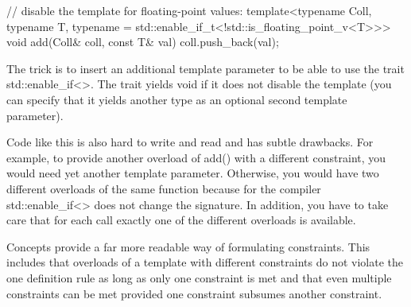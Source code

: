 \begin{cpp}
// disable the template for floating-point values:
template<typename Coll, typename T,
typename = std::enable_if_t<!std::is_floating_point_v<T>>>
void add(Coll& coll, const T& val)
{
	coll.push_back(val);
}
\end{cpp}

The trick is to insert an additional template parameter to be able to use the trait std::enable\_if<>. The trait yields void if it does not disable the template (you can specify that it yields another type as an optional second template parameter).

Code like this is also hard to write and read and has subtle drawbacks. For example, to provide another overload of add() with a different constraint, you would need yet another template parameter. Otherwise, you would have two different overloads of the same function because for the compiler std::enable\_if<> does not change the signature. In addition, you have to take care that for each call exactly one of the different overloads is available.

Concepts provide a far more readable way of formulating constraints. This includes that overloads of a template with different constraints do not violate the one definition rule as long as only one constraint is met and that even multiple constraints can be met provided one constraint subsumes another constraint.




